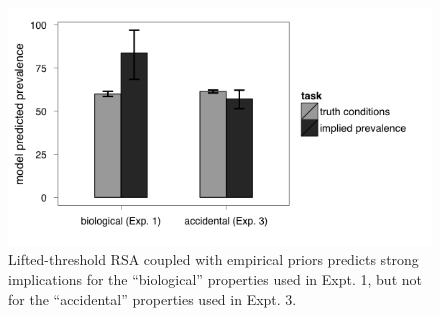 \documentclass[10pt,letterpaper]{article}
\begin{document}
%
%
%
%
%
%


\begin{figure}
\centering
    \includegraphics[width=0.8\columnwidth]{model_asymmetries}
    \caption{Lifted-threshold RSA coupled with empirical priors predicts strong implications for the ``biological'' properties used in Expt. 1, but not for the ``accidental'' properties used in Expt. 3.}
  \label{fig:model_asyms}
\end{figure}
\end{document}
